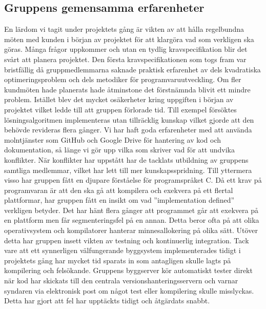 	
\subsection{Gruppens gemensamma erfarenheter}
En lärdom vi tagit under projektets gång är vikten av att hålla regelbundna möten med kunden i början av projektet för att klargöra vad som verkligen ska göras. Många frågor uppkommer och utan en tydlig kravspecifikation blir det svårt att planera projektet. Den första kravspecifikationen som togs fram var bristfällig då gruppmedlemmarna saknade praktisk erfarenhet av dels kvadratiska optimeringsproblem och dels metodiker för programvaruutveckling. Om fler kundmöten hade planerats hade åtminstone det förstnämnda blivit ett mindre problem. Istället blev det mycket osäkerheter kring uppgiften i början av projektet vilket ledde till att gruppen förlorade tid. Till exempel försöktes lösningsalgoritmen implementeras utan tillräcklig kunskap vilket gjorde att den behövde revideras flera gånger.
\newline
\newline
Vi har haft goda erfarenheter med att använda molntjänster som GitHub och Google Drive för hantering av kod och dokumentation, så länge vi gör upp vilka som skriver vad för att undvika konflikter. När konflikter har uppstått har de tacklats utbildning av gruppens samtliga medlemmar, vilket har lett till mer kunskapsspridning.
\newline
\newline
Till yttermera visso har gruppen fått en djupare förståelse för programspråket C. Då ett krav på programvaran är att den ska gå att kompilera och exekvera på ett flertal plattformar, har gruppen fått en insikt om vad ''implementation defined'' verkligen betyder. Det har hänt flera gånger att programmet går att exekvera på en plattform men får segmenteringsfel på en annan. Detta beror ofta på att olika operativsystem och kompilatorer hanterar minnesallokering på olika sätt.
\newline
\newline
Utöver detta har gruppen insett vikten av testning och kontinuerlig integration. Tack vare att ett synnerligen välfungerande byggsystem implementerades tidigt i projektets gång har mycket tid sparats in som antagligen skulle lagts på kompilering och felsökande. Gruppens byggserver kör automatiskt tester direkt när kod har skickats till den centrala versionshanteringsservern och varnar syndaren via elektronisk post om något test eller kompilering skulle misslyckas. Detta har gjort att fel har upptäckts tidigt och åtgärdats snabbt.

